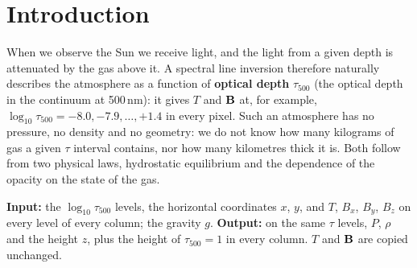 


\begin{abstract}
\noindent A Stokes inversion returns the temperature and the magnetic field of the solar atmosphere on surfaces of constant
optical depth, not at geometric heights. This mode turns such an atmosphere into a physical one: for every pixel column it
computes the gas pressure and the density on each optical-depth level and the geometric height at which the level lies,
assuming that each column is in hydrostatic equilibrium on its own. We derive the hydrostatic equation in optical depth,
show why it needs no externally supplied reference pressure and what replaces it, describe the closure at the top of the
column, the numerical integration (including the steep pressure rise below hot-over-cool interfaces), and the rule that
places the columns relative to each other in height by equalising the total (gas plus magnetic) pressure. All assumptions
are listed.
\end{abstract}

\section{Introduction}
When we observe the Sun we receive light, and the light from a given depth is attenuated by the gas above it. A spectral
line inversion therefore naturally describes the atmosphere as a function of \textbf{optical depth} $\tau_{500}$ (the
optical depth in the continuum at 500\,nm): it gives $T$ and $\mathbf B$ at, for example, $\log_{10}\tau_{500}=-8.0,-7.9,\dots,+1.4$
in every pixel. Such an atmosphere has no pressure, no density and no geometry: we do not know how many kilograms of gas a
given $\tau$ interval contains, nor how many kilometres thick it is. Both follow from two physical laws, hydrostatic
equilibrium and the dependence of the opacity on the state of the gas.

\textbf{Input:} the $\log_{10}\tau_{500}$ levels, the horizontal coordinates $x$, $y$, and $T$, $B_x$, $B_y$, $B_z$ on every
level of every column; the gravity $g$. \textbf{Output:} on the same $\tau$ levels, $P$, $\rho$ and the height $z$, plus the
height of $\tau_{500}=1$ in every column. $T$ and $\mathbf B$ are copied unchanged.

